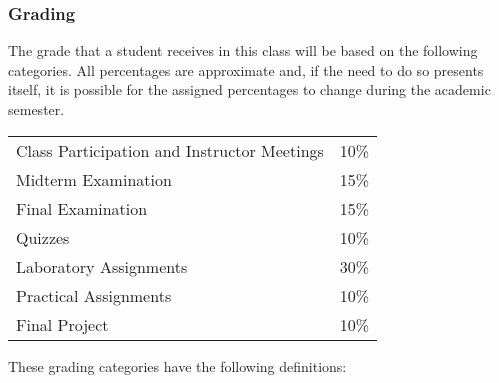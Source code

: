 \subsubsection*{Grading}

The grade that a student receives in this class will be based on the following categories. All percentages are
approximate and, if the need to do so presents itself, it is possible for the assigned percentages to change during the
academic semester.

\begin{center}
  \begin{tabular}{ll}
    Class Participation and Instructor Meetings & 10\% \\
    Midterm Examination                         & 15\% \\
    Final Examination                           & 15\% \\
    Quizzes                                     & 10\% \\
    Laboratory Assignments                      & 30\% \\
    Practical Assignments                       & 10\% \\
    Final Project                               & 10\%
  \end{tabular}
\end{center}

\noindent
These grading categories have the following definitions:
\vspace*{-.1in}

